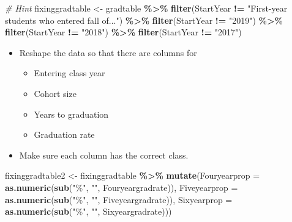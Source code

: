 \documentclass[
]{article}
\newenvironment{Shaded}{\begin{snugshade}}{\end{snugshade}}
\newcommand{\AttributeTok}[1]{\textcolor[rgb]{0.13,0.29,0.53}{#1}}
\newcommand{\CommentTok}[1]{\textcolor[rgb]{0.56,0.35,0.01}{\textit{#1}}}
\newcommand{\FunctionTok}[1]{\textcolor[rgb]{0.13,0.29,0.53}{\textbf{#1}}}
\newcommand{\NormalTok}[1]{#1}
\newcommand{\OtherTok}[1]{\textcolor[rgb]{0.56,0.35,0.01}{#1}}
\newcommand{\SpecialCharTok}[1]{\textcolor[rgb]{0.81,0.36,0.00}{\textbf{#1}}}
\newcommand{\StringTok}[1]{\textcolor[rgb]{0.31,0.60,0.02}{#1}}
\providecommand{\tightlist}{%
  \setlength{\itemsep}{0pt}\setlength{\parskip}{0pt}}
\begin{document}
\begin{Shaded}
\begin{Highlighting}[]
\CommentTok{\# Hint}
\NormalTok{fixinggradtable }\OtherTok{\textless{}{-}}\NormalTok{ gradtable }\SpecialCharTok{\%\textgreater{}\%}
\FunctionTok{filter}\NormalTok{(StartYear }\SpecialCharTok{!=} \StringTok{"First{-}year students who entered fall of..."}\NormalTok{) }\SpecialCharTok{\%\textgreater{}\%}
  \FunctionTok{filter}\NormalTok{(StartYear }\SpecialCharTok{!=} \StringTok{"2019"}\NormalTok{) }\SpecialCharTok{\%\textgreater{}\%}
  \FunctionTok{filter}\NormalTok{(StartYear }\SpecialCharTok{!=} \StringTok{"2018"}\NormalTok{) }\SpecialCharTok{\%\textgreater{}\%}
  \FunctionTok{filter}\NormalTok{(StartYear }\SpecialCharTok{!=} \StringTok{"2017"}\NormalTok{)}
\end{Highlighting}
\end{Shaded}

\begin{itemize}
\tightlist
\item
  Reshape the data so that there are columns for

  \begin{itemize}
  \tightlist
  \item
    Entering class year
  \item
    Cohort size
  \item
    Years to graduation
  \item
    Graduation rate
  \end{itemize}
\item
  Make sure each column has the correct class.
\end{itemize}

\begin{Shaded}
\begin{Highlighting}[]
\NormalTok{fixinggradtable2 }\OtherTok{\textless{}{-}}\NormalTok{ fixinggradtable }\SpecialCharTok{\%\textgreater{}\%}
  \FunctionTok{mutate}\NormalTok{(}\AttributeTok{Fouryearprop =} \FunctionTok{as.numeric}\NormalTok{(}\FunctionTok{sub}\NormalTok{(}\StringTok{"\%"}\NormalTok{, }\StringTok{""}\NormalTok{, Fouryeargradrate)), }
         \AttributeTok{Fiveyearprop =} \FunctionTok{as.numeric}\NormalTok{(}\FunctionTok{sub}\NormalTok{(}\StringTok{"\%"}\NormalTok{, }\StringTok{""}\NormalTok{, Fiveyeargradrate)),}
         \AttributeTok{Sixyearprop =} \FunctionTok{as.numeric}\NormalTok{(}\FunctionTok{sub}\NormalTok{(}\StringTok{"\%"}\NormalTok{, }\StringTok{""}\NormalTok{, Sixyeargradrate)))}
\end{Highlighting}
\end{Shaded}
\end{document}
